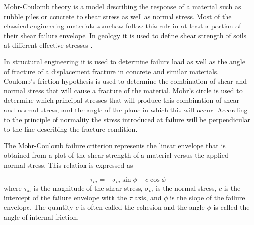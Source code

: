 Mohr-Coulomb theory is a model describing the response of a material such as rubble piles or concrete to shear stress as well as normal stress. 
Most of the classical engineering materials somehow follow this rule in at least a portion of their shear failure envelope. In geology it is used to define shear strength of soils at different effective stresses \cite{hand69}.

In structural engineering it is used to determine failure load as well as the angle of fracture of a displacement fracture in concrete and similar materials. Coulomb's friction hypothesis is used to determine the combination of shear and normal stress that will cause a fracture of the material. Mohr's circle is used to determine which principal stresses that will produce this combination of shear and normal stress, and the angle of the plane in which this will occur. According to the principle of normality the stress introduced at failure will be perpendicular to the line describing the fracture condition.


The Mohr-Coulomb failure criterion represents the linear envelope that is obtained from a plot of the shear strength of a material 
versus the applied normal stress. This relation is expressed as \cite[p219]{owhi}



\begin{equation}
\tau_m = -\sigma_m \sin \phi + c \cos \phi  \label{eq:mccrit}
\end{equation}
where $\tau_m$ is the magnitude of the shear stress, 
$\sigma_m$ is the normal stress, $c$ is the intercept of the failure envelope with the $\tau$ axis, 
and $\phi$ is the slope of the failure envelope. 
The quantity $c$ is often called the cohesion and the angle $\phi$ is called the angle of internal friction.
 
